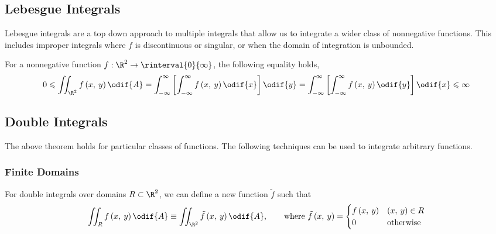\documentclass{article}
\begin{document}
\subsection{Lebesgue Integrals}
Lebesgue integrals are a top down approach to multiple integrals that
allow us to integrate a wider class of nonnegative functions. This
includes improper integrals where \(f\) is discontinuous or singular,
or when the domain of integration is unbounded.
\begin{theorem}
    For a nonnegative function \(f : \R^2 \to \rinterval{0}{\infty}\),
    the following equality holds,
    \begin{equation*}
        0 \leqslant \iint_{\R^2} f\left( x,\: y \right) \odif{A} = \int_{-\infty}^\infty \left[ \int_{-\infty}^\infty f\left( x,\: y \right) \odif{x} \right] \odif{y} = \int_{-\infty}^\infty \left[ \int_{-\infty}^\infty f\left( x,\: y \right) \odif{y} \right] \odif{x} \leqslant \infty
    \end{equation*}
\end{theorem}
\subsection{Double Integrals}
The above theorem holds for particular classes of functions. The
following techniques can be used to integrate arbitrary functions.
\subsubsection{Finite Domains}
For double integrals over domains \(R \subset \R^2\), we can define a
new function \(\tilde{f}\) such that
\begin{equation*}
    \iint_R f\left( x,\: y \right) \odif{A} \equiv \iint_{\R^2} \tilde{f}\left( x,\: y \right) \odif{A}, \qquad \text{where } \tilde{f}\left( x,\: y \right) =
    \begin{cases}
        f\left( x,\: y \right) & \left( x,\: y \right) \in R \\
        0                      & \text{otherwise}
    \end{cases}
\end{equation*}
\end{document}
